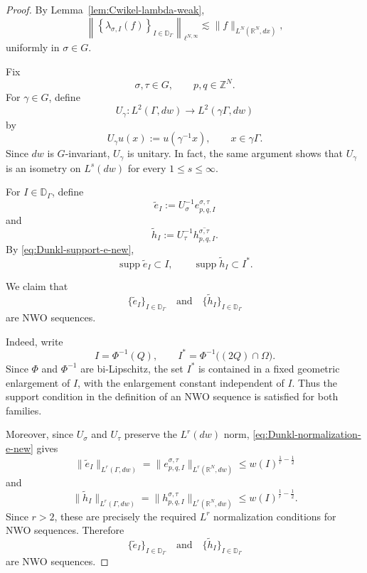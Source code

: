 \documentclass[12pt]{amsart}
\begin{document}
\begin{proof}
By Lemma~\ref{lem:Cwikel-lambda-weak},
\begin{equation}\label{eq:Cwikel-block-lambda-weak}
\left\|
\left\{
\lambda_{\sigma,I}(f)
\right\}_{I\in\mathbb D_\Gamma}
\right\|_{\ell^{N,\infty}}
\lesssim
\|f\|_{L^N(\mathbb R^N,dx)},
\end{equation}
uniformly in $\sigma\in G$.

Fix
\[
\sigma,\tau\in G,
\qquad
p,q\in\mathbb Z^N.
\]
For $\gamma\in G$, define
\[
U_\gamma:
L^2(\Gamma,dw)
\longrightarrow
L^2(\gamma\Gamma,dw)
\]
by
\[
U_\gamma u(x)
:=
u(\gamma^{-1}x),
\qquad x\in\gamma\Gamma.
\]
Since $dw$ is $G$-invariant, $U_\gamma$ is unitary. In fact, the same
argument shows that $U_\gamma$ is an isometry on $L^s(dw)$ for every
$1\leq s\leq\infty$.

For $I\in\mathbb D_\Gamma$, define
\[
\widetilde e_I
:=
U_\sigma^{-1}
e_{p,q,I}^{\sigma,\tau}
\]
and
\[
\widetilde h_I
:=
U_\tau^{-1}
\overline{h_{p,q,I}^{\sigma,\tau}}.
\]
By \eqref{eq:Dunkl-support-e-new},
\[
\operatorname{supp}\widetilde e_I
\subset I,
\qquad
\operatorname{supp}\widetilde h_I
\subset I^\ast.
\]

We claim that
\[
\{\widetilde e_I\}_{I\in\mathbb D_\Gamma}
\quad\text{and}\quad
\{\widetilde h_I\}_{I\in\mathbb D_\Gamma}
\]
are NWO sequences.

Indeed, write
\[
I=\Phi^{-1}(Q),
\qquad
I^\ast=\Phi^{-1}\bigl((2Q)\cap\Omega\bigr).
\]
Since $\Phi$ and $\Phi^{-1}$ are bi-Lipschitz, the set $I^\ast$ is
contained in a fixed geometric enlargement of $I$, with the enlargement
constant independent of $I$. Thus the support condition in the
definition of an NWO sequence is satisfied for both families.

Moreover, since $U_\sigma$ and $U_\tau$ preserve the $L^r(dw)$ norm,
\eqref{eq:Dunkl-normalization-e-new} gives
\begin{equation}\label{eq:Cwikel-block-NWO-norm-e}
\|\widetilde e_I\|_{L^r(\Gamma,dw)}
=
\|e_{p,q,I}^{\sigma,\tau}\|_{L^r(\mathbb R^N,dw)}
\leq
w(I)^{\frac1r-\frac12}
\end{equation}
and
\begin{equation}\label{eq:Cwikel-block-NWO-norm-h}
\|\widetilde h_I\|_{L^r(\Gamma,dw)}
=
\|h_{p,q,I}^{\sigma,\tau}\|_{L^r(\mathbb R^N,dw)}
\leq
w(I)^{\frac1r-\frac12}.
\end{equation}
Since $r>2$, these are precisely the required $L^r$ normalization
conditions for NWO sequences. Therefore
\[
\{\widetilde e_I\}_{I\in\mathbb D_\Gamma}
\quad\text{and}\quad
\{\widetilde h_I\}_{I\in\mathbb D_\Gamma}
\]
are NWO sequences.


\end{proof}
\end{document}
